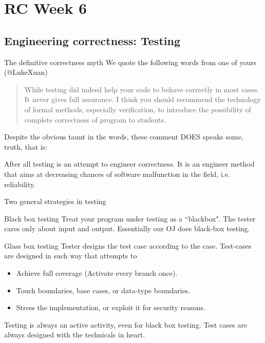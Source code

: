 \section{RC Week 6}
\subsection{Engineering correctness: Testing}
\begin{frame}{The definitive correctness myth}
We quote the following words from one of yours (@LukeXuan)
\begin{quotation}
	While testing did indeed help your code to behave correctly in most cases. It never gives full assurance. I think you should recommend the technology of formal methods, especially verification, to introduce the possibility of complete correctness of program to students.
\end{quotation}
Despite the obvious taunt in the words, these comment DOES speaks some, truth, that is:
\begin{center}
\end{center}
After all testing is an attempt to engineer correctness. It is an engineer method that aims at decreasing chances of software malfunction in the field, i.e. reliability.
\end{frame}

\begin{frame}{Two general strategies in testing}
\begin{block}{Black box testing}
	Treat your program under testing as a ``blackbox". The tester cares only about input and output. Essentially our OJ does black-box testing.
\end{block}
\begin{block}{Glass box testing}
	Tester designs the test case according to the case. Test-cases are designed in such way that attempts to
	\begin{itemize}
		\item Achieve full coverage (Activate every branch once).
		\item Touch boundaries, base cases, or data-type boundaries.
		\item Stress the implementation, or exploit it for security reasons.
	\end{itemize}
\end{block}
\alert{Testing is always an active activity}, even for black box testing. Test cases are always designed with the technicals in heart.
\end{frame}


